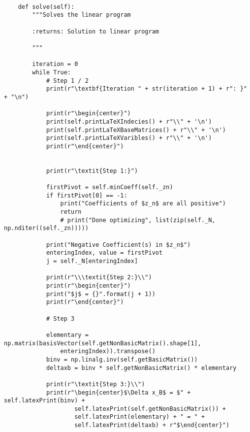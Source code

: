 \documentclass{article}
\begin{document}
\begin{lstlisting}

    def solve(self):
        """Solves the linear program

        :returns: Solution to linear program

        """

        iteration = 0
        while True:
            # Step 1 / 2
            print(r"\textbf{Iteration " + str(iteration + 1) + r": }" + "\n")

            print(r"\begin{center}")
            print(self.printLaTeXIndecies() + r"\\" + '\n')
            print(self.printLaTeXBaseMatrices() + r"\\" + '\n')
            print(self.printLaTeXVaribles() + r"\\" + '\n')
            print(r"\end{center}")


            print(r"\textit{Step 1:}")

            firstPivot = self.minCoeff(self._zn)
            if firstPivot[0] == -1:
                print("Coefficients of $z_n$ are all positive")
                return
                # print("Done optimizing", list(zip(self._N, np.nditer((self._zn)))))

            print("Negative Coefficient(s) in $z_n$")
            enteringIndex, value = firstPivot
            j = self._N[enteringIndex]

            print(r"\\\textit{Step 2:}\\")
            print(r"\begin{center}")
            print("$j$ = {}".format(j + 1))
            print(r"\end{center}")

            # Step 3

            elementary = np.matrix(basisVector(self.getNonBasicMatrix().shape[1],
                enteringIndex)).transpose()
            binv = np.linalg.inv(self.getBasicMatrix())
            deltaxb = binv * self.getNonBasicMatrix() * elementary

            print(r"\textit{Step 3:}\\")
            print(r"\begin{center}$\Delta x_B$ = $" + self.latexPrint(binv) +
                    self.latexPrint(self.getNonBasicMatrix()) +
                    self.latexPrint(elementary) + " = " +
                    self.latexPrint(deltaxb) + r"$\end{center}")



\end{lstlisting}
\end{document}
